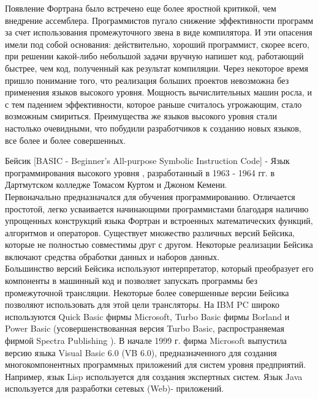 Появление Фортрана было встречено еще более яростной критикой, чем внедрение ассемблера. Программистов пугало снижение эффективности программ за счет использования промежуточного звена в виде компилятора. И эти опасения имели под собой основания: действительно, хороший программист, скорее всего, при решении какой-либо небольшой задачи вручную напишет код, работающий быстрее, чем код, полученный как результат компиляции. Через некоторое время пришло понимание того, что реализация больших проектов невозможна без применения языков высокого уровня. Мощность вычислительных машин росла, и с тем падением эффективности, которое раньше считалось угрожающим, стало возможным смириться. Преимущества же языков высокого уровня стали настолько очевидными, что побудили разработчиков к созданию новых языков, все более и более совершенных. \\


Бейсик [BASIC - Beginner’s All-purpose Symbolic Instruction Code] - Язык программирования высокого уровня , разработанный в 1963 - 1964 гг. в Дартмутском колледже Томасом Куртом и Джоном Кемени. \\

Первоначально предназначался для обучения программированию. Отличается простотой, легко усваивается начинающими программистами благодаря наличию упрощенных конструкций языка Фортран и встроенных математических функций, алгоритмов и операторов. Существует множество различных версий Бейсика, которые не полностью совместимы друг с другом. Некоторые реализации Бейсика включают средства обработки данных и наборов данных. \\

Большинство версий Бейсика используют интерпретатор, который преобразует его компоненты в машинный код и позволяет запускать программы без промежуточной трансляции. Некоторые более совершенные версии Бейсика позволяют использовать для этой цели трансляторы. На IBM PC широко используются Quick Basic фирмы Microsoft, Turbo Basic фирмы Borland и Power Basic (усовершенствованная версия Turbo Basic, распространяемая фирмой Spectra Publishing ). В начале 1999 г. фирма Microsoft выпустила версию языка Visual Basic 6.0 (VB 6.0), предназначенного для создания многокомпонентных программных приложений для систем уровня предприятий. \\

Например, язык Lisp используется для создания экспертных систем. Язык Java используется для разработки сетевых (Web)- приложений. \\

